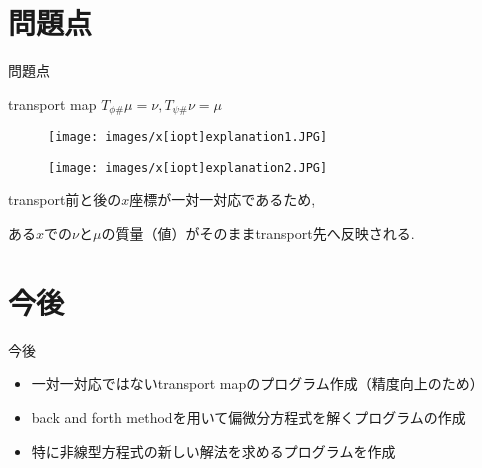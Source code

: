 \documentclass[aspectratio=169, dvipdfmx, 12pt]{beamer}
\begin{document}
\section{問題点}
\begin{frame}{問題点}

    \begin{block}{transport map}
        $T_{\phi \#} \mu = \nu, T_{\psi \#} \nu = \mu$
    \end{block}

    \begin{figure}[htb]
        \begin{center}
            \begin{minipage}{0.40\hsize}
                \texttt{[image: images/x[iopt]explanation1.JPG]}
            \end{minipage}
            \begin{minipage}{0.40\hsize}
                \texttt{[image: images/x[iopt]explanation2.JPG]}
            \end{minipage}
        \end{center}
    \end{figure}
    \label{x[iopt]explanation}

    transport前と後の$x$座標が一対一対応であるため,

    ある$x$での$\nu$と$\mu$の質量（値）がそのままtransport先へ反映される.

\end{frame}

\section{今後}
\begin{frame}{今後}
    \begin{itemize}
        \item 一対一対応ではないtransport mapのプログラム作成（精度向上のため）
        \item back and forth methodを用いて偏微分方程式を解くプログラムの作成
        \item 特に非線型方程式の新しい解法を求めるプログラムを作成
    \end{itemize}

\end{frame}
\end{document}

